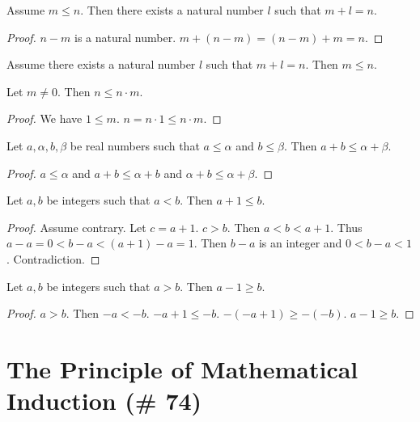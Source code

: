 \documentclass{article}
\begin{document}
\begin{forthel}
\begin{lemma}
Assume $m \leq n$. Then
there exists a natural number $l$ such that $m + l = n$.
\end{lemma}
\begin{proof}
$n - m$ is a natural number. $m + (n-m) = (n - m) + m = n$.
\end{proof}

\begin{lemma}
Assume there exists a natural number $l$ such 
that $m + l = n$. Then $m \leq n$.
\end{lemma}

\begin{lemma}
Let $m \neq 0$. Then $n \leq n \cdot m$.
\end{lemma}
\begin{proof}
We have $1 \leq m$. $n = n \cdot 1 \leq n \cdot m$.
\end{proof}

\begin{lemma}
Let $a,\alpha,b,\beta$ be real numbers such that $a \leq \alpha$ and $b \leq \beta$.
Then $a + b \leq \alpha + \beta$.
\end{lemma}
\begin{proof}
$a \leq \alpha$ and $a + b \leq \alpha + b$ and $\alpha + b \leq \alpha + \beta$.
\end{proof}

\begin{lemma}
Let $a,b$ be integers such that $a < b$.
Then $a + 1 \leq b$.
\end{lemma}
\begin{proof}
Assume contrary. Let $c = a+1$. $c>b$.
Then $a < b < a + 1$. Thus $a - a = 0 < b - a < (a + 1) - a = 1$. Then $b - a$ is an integer
and $0 < b - a < 1$. Contradiction.
\end{proof}

\begin{lemma}
Let $a,b$ be integers such that $a > b$.
Then $a - 1 \geq b$.
\end{lemma}
\begin{proof}
$a > b$. Then $-a < -b$. $-a + 1 \leq -b$. $-(-a + 1) \geq -(-b)$. $a - 1 \geq b$.
\end{proof}
\end{forthel}

\section{The Principle of Mathematical Induction (\# 74)}
\end{document}
